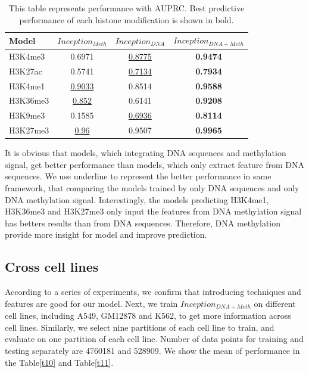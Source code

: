 \begin{table}[H]%
    \centering
    \begin{tabular}{lccc}
    \hline
    Model & $Inception_{Meth}$ & $Inception_{DNA}$ & $Inception_{DNA+Meth}$ \\\hline
    H3K4me3 & 0.6971 & \underline{0.8775} & \textbf{0.9474} \\
    H3K27ac & 0.5741 & \underline{0.7134} & \textbf{0.7934} \\
    H3K4me1 & \underline{0.9033} & 0.8514 & \textbf{0.9588} \\
    H3K36me3 & \underline{0.852} & 0.6141 & \textbf{0.9208} \\
    H3K9me3 & 0.1585 & \underline{0.6936} & \textbf{0.8114} \\
    H3K27me3 & \underline{0.96} & 0.9507 & \textbf{0.9965} \\\hline
    \end{tabular}
    \captionsetup{labelfont=bf}
    \renewcommand{\baselinestretch}{1.0}
    \caption[Comparison of different inputs of inception with AUPRC]{This table represents performance with AUPRC. Best predictive performance of each histone modification is shown in bold.}
    \label{t9}
\end{table}

It is obvious that models, which integrating DNA sequences and methylation signal, get better performance than models, which only extract feature from DNA sequences. We use underline to represent the better performance in same framework, that comparing the models trained by only DNA sequences and only DNA methylation signal. Interestingly, the models predicting H3K4me1, H3K36me3 and H3K27me3 only input the features from DNA methylation signal has betters results than from DNA sequences. Therefore, DNA methylation provide more insight for model and improve prediction.

\subsection{Cross cell lines} \label{cross}
According to a series of experiments, we confirm that introducing techniques and features are good for our model. Next, we train $Inception_{DNA+Meth}$ on  different cell lines, including A549, GM12878 and K562, to get more information across cell lines. Similarly, we select nine partitions of each cell line to train, and evaluate on one partition of each cell line. Number of data points for training and testing separately are 4760181 and 528909. We show the mean of performance in the Table\ref{t10} and Table\ref{t11}.


